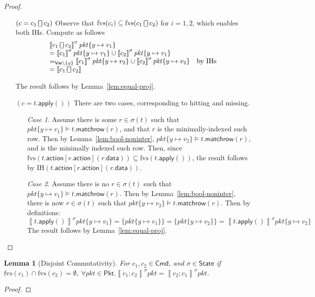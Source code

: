 \documentclass{article}
\newcommand{\pkt}{\mathit{pkt}}
\newcommand{\denote}[1]{\left\llbracket#1\right\rrbracket}
\newcommand{\Cmd}{\mathsf{Cmd}}
\newcommand{\Pkt}{\mathsf{Pkt}}
\newcommand{\Var}{\mathsf{Var}}
\newcommand{\State}{\mathsf{State}}
\newcommand{\action}{\mathsf{action}}
\newcommand{\data}{\mathsf{data}}
\newcommand{\apply}{\mathsf{apply}}
\newcommand{\choiceop}{\rotatebox[origin=c]{90}{$\sqsubset\!\!\!\sqsupset$}}
\newcommand{\choice}{\mathbin{\choiceop}}
\newcommand{\fvs}{\textrm{fvs}}
\newcommand{\matchrow}{\mathsf{matchrow}}
\newtheorem{lemma}{Lemma}
\begin{document}
\begin{proof}
\begin{enumerate}[align=left]
    \item[$(c = c_1 \choice c_2)$] Observe that $\fvs(c_i) \subseteq \fvs(c_1 \choice c_2)$ for
      $i = 1,2$, which enables both IHs. Compute as follows
      \[\begin{array}{ll}
      \denote{c_1 \choice c_2}^\sigma\pkt\{y \mapsto v_1\} \\
      = \denote{c_1}^\sigma\pkt\{y \mapsto v_1\} \cup \denote{c_2}^\sigma\pkt\{y \mapsto v_1\} \\
      =_{\Var \setminus \{y\}} \denote{c_1}^\sigma\pkt\{y \mapsto v_2\} \cup \denote{c_2}^\sigma\pkt\{y \mapsto v_2\}
      & \text{by IHs} \\
      = \denote{c_1 \choice c_2}
      \end{array}
      \]

      The result follows by Lemma~\ref{lem:equal-proj}.

    \item[$(c = t.\apply())$]
      There are two cases, corresponding to hitting and missing.
      \begin{enumerate}[align=left]
      \item[\textit{Case 1}.] Assume there is some $r \in \sigma(t)$ such that
        $\pkt\{y \mapsto v_1\} \models t.\matchrow(r)$, and that $r$ is the
        minimally-indexed such row. Then by Lemma~\ref{lem:bool-noninter},
        $\pkt\{y \mapsto v_2\} \models t.\matchrow(r)$, and is the minimally indexed such row. Then, since
        $\fvs(t.\action[r.\action](r.\data)) \subseteq \fvs(t.\apply())$, the
        result follows by IH$(t.\action[r.\action](r.\data))$.

        \item[\textit{Case 2}.] Assume there is no $r \in \sigma(t)$ such that
          $\pkt\{y \mapsto v_1\} \models t.\matchrow(r)$. Then by
          Lemma~\ref{lem:bool-noninter}, there is now $r \in \sigma(t)$ such
          that $\pkt\{y \mapsto v_2\} \models t.\matchrow(r)$. Then by definitions:
          \[\denote{t.\apply()}^\sigma \pkt\{y \mapsto v_1\} = \{\pkt\{y \mapsto v_1\}\} = \{\pkt\{y \mapsto v_2\}\} = \denote{t.\apply()}^\sigma \pkt\{y \mapsto v_2\}\]
          The result follows by Lemma~\ref{lem:equal-proj}.
      \end{enumerate}

  \end{enumerate}
\end{proof}

\begin{lemma}[Disjoint Commutativity]
  \label{lem:disj-comm}
  For $c_1,c_2 \in \Cmd$, and $\sigma \in \State$ if $\fvs(c_1) \cap
  \fvs(c_2) = \emptyset$, $ \forall \pkt \in \Pkt. \denote{c_1;c_2}^\sigma\pkt =
  \denote{c_2;c_1}^\sigma \pkt$.
\end{lemma}
\begin{proof}
\end{proof}
\end{document}
